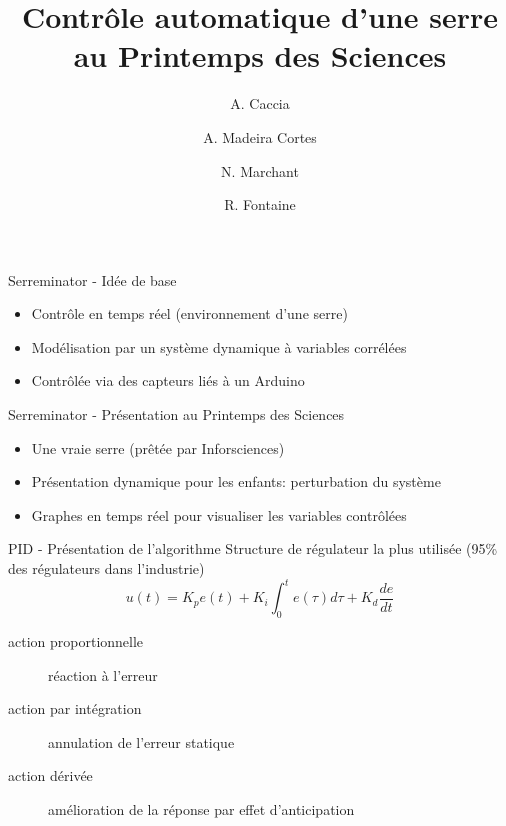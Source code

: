 \documentclass{beamer}
\title{Contrôle automatique d'une serre au Printemps des Sciences}
\date{ }
\author{A. Caccia \and A. Madeira Cortes \and N. Marchant \and R. Fontaine}
\institute{Université Libre de Bruxelles}
\begin{document}
	\maketitle

		\begin{frame}{Serreminator - Idée de base}
			\begin{itemize}
        	\item Contrôle en temps réel (environnement d'une serre)
        	\item Modélisation par un système dynamique à variables corrélées
        	\item Contrôlée via des capteurs liés à un Arduino
      		\end{itemize}
		\end{frame}

		\begin{frame}{Serreminator - Présentation au Printemps des Sciences}
			\begin{itemize}
        	\item Une vraie serre (prêtée par Inforsciences)
        	\item Présentation dynamique pour les enfants: perturbation du système
        	\item Graphes en temps réel pour visualiser les variables contrôlées
      		\end{itemize}
		\end{frame}

		\begin{frame}{PID - Présentation de l'algorithme}
			Structure de régulateur la plus utilisée (95\% des régulateurs dans l'industrie)
			$$u(t) = K_p e(t) + K_i \int_{0}^{t} e(\tau) d\tau + K_d \frac{de}{dt}$$
			\begin{description}
				\item[action proportionnelle] réaction à l'erreur
				\item[action par intégration] annulation de l'erreur statique
				\item[action dérivée] amélioration de la réponse par effet d'anticipation
			\end{description}
		\end{frame}
\end{document}
